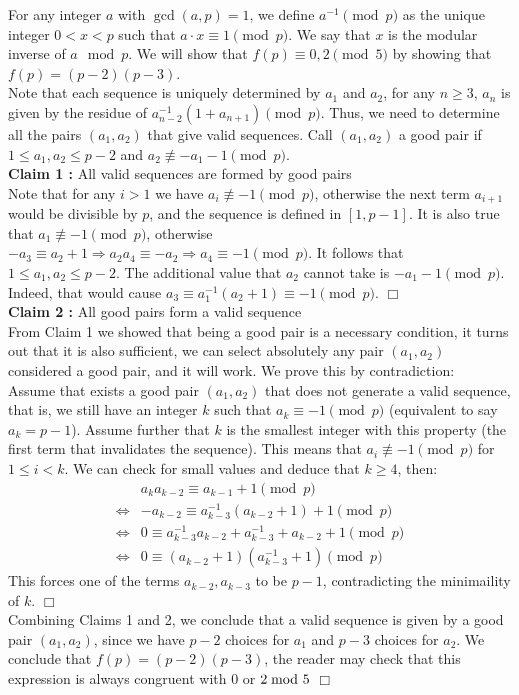 \begin{solution}
    For any integer $a$ with $\gcd(a,p)=1$, we define $a^{-1} \pmod p$ as the unique integer $0 <x < p$ such that $a \cdot x \equiv 1 \pmod p$. We say that $x$ is the modular inverse of $a \mod p$. 
    We will show that $f(p) \equiv 0,2 \pmod{5}$ by showing that $f(p) = (p-2)(p-3)$.\\[2mm]
    Note that each sequence is uniquely determined by $a_1$ and $a_2$, for any $n \geq 3$, $a_n$ is given by the residue of $a_{n-2}^{-1} (1 + a_{n+1}) \pmod p$. Thus, we need to determine all the pairs $(a_1,a_2)$ that give valid sequences. Call $(a_1,a_2)$ a good pair if $1 \leq a_1, a_2 \leq p-2$ and $a_2 \not \equiv -a_1-1 \pmod p$.\\[2mm]
    \textbf{Claim 1 :} All valid sequences are formed by good pairs \\[1mm]
        Note that for any $i > 1$ we have $a_i \not \equiv -1 \pmod p$, otherwise the next term $a_{i+1}$ would be divisible by $p$,  and the sequence is defined in $[1,p-1]$. It is also true that $a_1 \not \equiv -1 \pmod p$, otherwise $-a_3 \equiv a_2 + 1 \Rightarrow a_2a_4 \equiv -a_2 \Rightarrow a_4 \equiv -1 \pmod p$. It follows that $1 \leq a_1, a_2 \leq p-2$. The additional value that $a_2$ cannot take is $-a_1 -1 \pmod{p}$. Indeed, that would cause $a_3 \equiv a_1^{-1}(a_2+1) \equiv -1 \pmod p$. $\Box$ \\[2mm]
    \textbf{Claim 2 :} All good pairs form a valid sequence \\[1mm]
        From Claim 1 we showed that being a good pair is a necessary condition, it turns out that it is also sufficient, we can select absolutely any pair $(a_1,a_2)$ considered a good pair, and it will work. We prove this by contradiction: \\
        Assume that exists a good pair $(a_1,a_2)$ that does not generate a valid sequence, that is, we still have an integer $k$ such that $a_k \equiv -1 \pmod p$ (equivalent to say $a_k = p-1$). Assume further that $k$ is the smallest integer with this property (the first term that invalidates the sequence). This means that $a_i \not \equiv -1 \pmod p$ for $1 \leq i < k$. We can check for small values and deduce that $k \geq 4$, then:
        \begin{align*}
            &a_ka_{k-2} \equiv a_{k-1} + 1 \pmod p \\
            \iff& -a_{k-2} \equiv a_{k-3}^{-1}(a_{k-2}+1) + 1 \pmod p\\ 
            \iff& 0 \equiv a_{k-3}^{-1} a_{k-2} + a_{k-3}^{-1} + a_{k-2} + 1 \pmod p  \\
            \iff& 0 \equiv(a_{k-2} + 1) (a_{k-3}^{-1} + 1) \pmod p
        \end{align*}
        This forces one of the terms $a_{k-2}, a_{k-3}$ to be $p-1$, contradicting the minimaility of $k$. $\Box$ \\
        Combining Claims 1 and 2, we conclude that a valid sequence is given by a good pair $(a_1,a_2)$, since we have $p-2$ choices for $a_1$ and $p-3$ choices for $a_2$. We conclude that $f(p) = (p-2)(p-3)$, the reader may check that this expression is always congruent with 0 or $2 \hspace{-4pt}\mod 5$ $\Box$


\end{solution}
